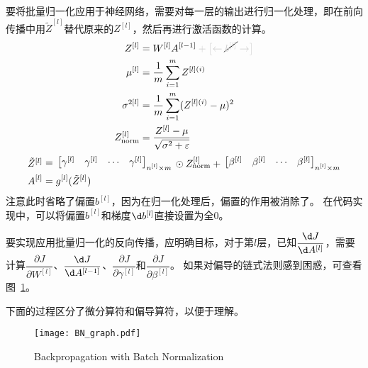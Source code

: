 要将批量归一化应用于神经网络，需要对每一层的输出进行归一化处理，即在前向传播中用$\tilde{Z}^{[l]}$替代原来的$Z^{[l]}$，然后再进行激活函数的计算。
\begin{align}
    Z^{[l]} &= W^{[l]}A^{[l-1]} \textcolor{lightgray}{\vphantom{1}+ \bigl[ \leftarrow \vphantom{1}} \cancel{\textcolor{lightgray}{b^{[l]}}} \textcolor{lightgray}{\vphantom{1} \rightarrow \bigr]} 
    \label{eq:batch_norm_zl} \\
    \mu^{[l]} &= \frac{1}{m}\sum_{i=1}^m Z^{[l](i)} 
    \label{eq:batch_norm_mu} \\
    \sigma^{2[l]} &= \frac{1}{m}\sum_{i=1}^m (Z^{[l](i)} - \mu)^2 
    \label{eq:batch_norm_sigma} \\
    Z^{[l]}_{\mathrm{norm}} &= \frac{Z^{[l]} - \mu}{\sqrt{\sigma^2 + \varepsilon}}
    \label{eq:batch_norm_znorm}
\end{align}
\begin{align}
    \vcenter{\hbox{$\tilde{Z}^{[l]}$}} &\vcenter{\hbox{$\vphantom{1}=\vphantom{1}$}} \begin{bmatrix} \gamma^{[l]} & \gamma^{[l]} & \cdots & \gamma^{[l]}\end{bmatrix}_{\substack{\scriptstyle n^{[l]}\times m}} \vcenter{\hbox{$\vphantom{1}\odot Z^{[l]}_{\mathrm{norm}} +\vphantom{1}$}} \begin{bmatrix} \beta^{[l]} & \beta^{[l]} & \cdots & \beta^{[l]} \end{bmatrix}_{\substack{\scriptstyle n^{[l]}\times m}} 
    \label{eq:batch_norm_ztilde} \\
    A^{[l]} &= g^{[l]}(\tilde{Z}^{[l]})
    \label{eq:batch_norm_al}
\end{align}
注意此时省略了偏置$b^{[l]}$，因为在归一化处理后，偏置的作用被消除了。
在代码实现中，可以将偏置$b^{[l]}$和梯度$\d b^{[l]}$直接设置为全0。

要实现应用批量归一化的反向传播，应明确目标，对于第$l$层，已知$\dfrac{\d J}{\d A^{[l]}}$，需要计算$\dfrac{\partial J}{\partial W^{[l]}}$、$\dfrac{\d J}{\d A^{[l-1]}}$、$\dfrac{\partial J}{\partial \gamma^{[l]}}$和$\dfrac{\partial J}{\partial \beta^{[l]}}$。
如果对偏导的链式法则感到困惑，可查看图~\ref{fig:batch_norm_backprop}。

下面的过程区分了微分算符和偏导算符，以便于理解。

\begin{figure}[h!pbt]
    \centering
    \texttt{[image: BN\_graph.pdf]}
    \caption{Backpropagation with Batch Normalization}
    \label{fig:batch_norm_backprop}
\end{figure}

